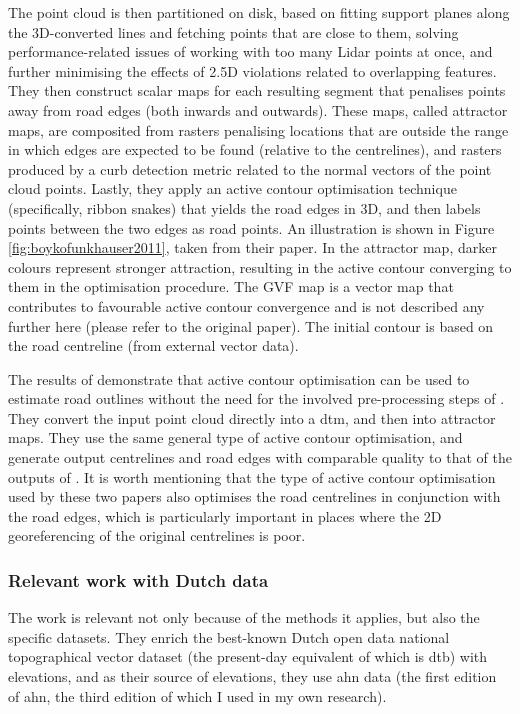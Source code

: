 The point cloud is then partitioned on disk, based on fitting support planes along the 3D-converted lines and fetching points that are close to them, solving performance-related issues of working with too many Lidar points at once, and further minimising the effects of 2.5D violations related to overlapping features. They then construct scalar maps for each resulting segment that penalises points away from road edges (both inwards and outwards). These maps, called attractor maps, are composited from rasters penalising locations that are outside the range in which edges are expected to be found (relative to the centrelines), and rasters produced by a curb detection metric related to the normal vectors of the point cloud points. Lastly, they apply an active contour optimisation technique (specifically, ribbon snakes) that yields the road edges in 3D, and then labels points between the two edges as road points. An illustration is shown in Figure \ref{fig:boykofunkhauser2011}, taken from their paper. In the attractor map, darker colours represent stronger attraction, resulting in the active contour converging to them in the optimisation procedure. The GVF map is a vector map that contributes to favourable active contour convergence and is not described any further here (please refer to the original paper). The initial contour is based on the road centreline (from external vector data).

The results of \cite{gopfert_etal_2011} demonstrate that active contour optimisation can be used to estimate road outlines without the need for the involved pre-processing steps of \cite{boyko_funkhauser_2011}. They convert the input point cloud directly into a \ac{dtm}, and then into attractor maps. They use the same general type of active contour optimisation, and generate output centrelines and road edges with comparable quality to that of the outputs of \cite{boyko_funkhauser_2011}. It is worth mentioning that the type of active contour optimisation used by these two papers also optimises the road centrelines in conjunction with the road edges, which is particularly important in places where the 2D georeferencing of the original centrelines is poor.

\subsubsection{Relevant work with Dutch data}

The work \cite{oudeElberink_vosselman_2006} is relevant not only because of the methods it applies, but also the specific datasets. They enrich the best-known Dutch open data national topographical vector dataset (the present-day equivalent of which is \ac{dtb}) with elevations, and as their source of elevations, they use \ac{ahn} data (the first edition of \ac{ahn}, the third edition of which I used in my own research).

